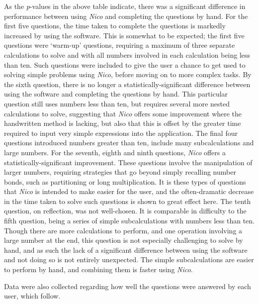 \documentclass[12pt,twoside,notitlepage,xetex]{report}
\begin{document}
As the \emph{p}-values in the above table indicate, there was a significant
difference in performance between using \emph{Nico} and completing the
questions by hand.  For the first five questions, the time taken to complete
the questions is markedly increased by using the software.  This is somewhat to
be expected;  the first five questions were `warm-up' questions, requiring a
maximum of three separate calculations to solve and with all numbers involved
in each calculation being less than ten.  Such questions were included to give
the user a chance to get used to solving simple problems using \emph{Nico},
before moving on to more complex tasks.  By the sixth question, there is no
longer a statistically-significant difference between using the software and
completing the questions by hand.  This particular question still uses numbers
less than ten, but requires several more nested calculations to solve,
suggesting that \emph{Nico} offers some improvement where the handwritten
method is lacking, but also that this is offset by the greater time required to
input very simple expressions into the application.  The final four questions
introduced numbers greater than ten, include many subcalculations and large
numbers.  For the seventh, eighth and ninth questions, \emph{Nico} offers a
statistically-significant improvement.  These questions involve the
manipulation of larger numbers, requiring strategies that go beyond simply
recalling number bonds, such as partitioning or long multiplication.  It is
these types of questions that \emph{Nico} is intended to make easier for the
user, and the often-dramatic decrease in the time taken to solve such questions
is shown to great effect here.  The tenth question, on reflection, was not
well-chosen.  It is comparable in difficulty to the fifth question, being a
series of simple subcalculations with numbers less than ten.  Though there are
more calculations to perform, and one operation involving a large number at the
end,  this question is not especially challenging to solve by hand, and as such
the lack of a significant difference between using the software and not doing
so is not entirely unexpected.  The simple subcalculations are easier to
perform by hand, and combining them is faster using \emph{Nico}.

Data were also collected regarding how well the questions were answered by each
user, which follow.
\end{document}
